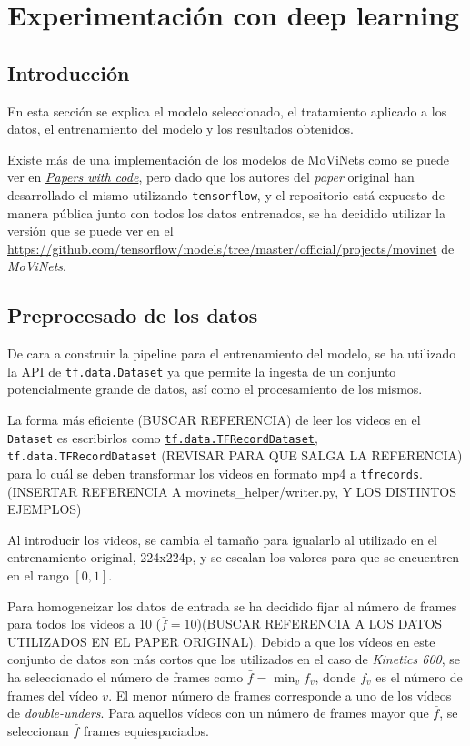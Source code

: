 \section{Experimentación con deep learning}\label{deep_learning}

\subsection{Introducción}

En esta sección se explica el modelo seleccionado, el tratamiento aplicado a los datos, el entrenamiento del modelo y los resultados obtenidos.

Existe más de una implementación de los modelos de MoViNets como se puede ver en \href{https://paperswithcode.com/paper/movinets-mobile-video-networks-for-efficient}{\textit{Papers with code}}, pero dado que los autores del \textit{paper} original han desarrollado el mismo utilizando \texttt{tensorflow}, y el repositorio está expuesto de manera pública junto con todos los datos entrenados, se ha decidido utilizar la versión que se puede ver en el \href{repositorio oficial}{https://github.com/tensorflow/models/tree/master/official/projects/movinet} de \textit{MoViNets}.

\subsection{Preprocesado de los datos}

De cara a construir la pipeline para el entrenamiento del modelo, se ha utilizado la API de \href{https://www.tensorflow.org/api_docs/python/tf/data/Dataset}{\texttt{tf.data.Dataset}} ya que permite la ingesta de un conjunto potencialmente grande de datos, así como el procesamiento de los mismos.

La forma más eficiente (BUSCAR REFERENCIA) de leer los videos en el \texttt{Dataset} es escribirlos como \href{https://www.tensorflow.org/api_docs/python/tf/data/TFRecordDataset}{\texttt{tf.data.TFRecordDataset}}, 
\texttt{tf.data.TFRecordDataset}
(REVISAR PARA QUE SALGA LA REFERENCIA)
para lo cuál se deben transformar los videos en formato mp4 a \texttt{tfrecords}. (INSERTAR REFERENCIA A movinets\_helper/writer.py, Y LOS DISTINTOS EJEMPLOS)

Al introducir los videos, se cambia el tamaño para igualarlo al utilizado en el entrenamiento original, 224x224p, y se escalan los valores para que se encuentren en el rango $[0, 1]$.

Para homogeneizar los datos de entrada se ha decidido fijar al número de frames para todos los videos a 10 ($\bar{f}=10$)(BUSCAR REFERENCIA A LOS DATOS UTILIZADOS EN EL PAPER ORIGINAL). Debido a que los vídeos en este conjunto de datos son más cortos que los utilizados en el caso de \textit{Kinetics 600}, se ha seleccionado el número de frames como $\bar{f} = \min_v f_{v}$, donde $f_v$ es el número de frames del vídeo $v$. El menor número de frames corresponde a uno de los vídeos de \textit{double-unders}. Para aquellos vídeos con un número de frames mayor que $\bar{f}$, se seleccionan $\bar{f}$ frames equiespaciados.


